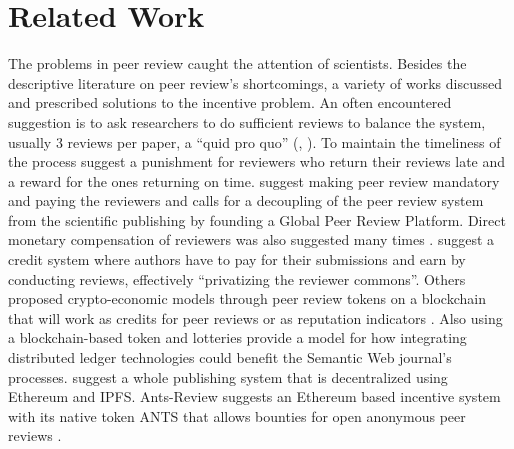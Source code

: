 \section{Related Work}

The problems in peer review caught the attention of scientists. Besides the descriptive literature on peer review’s shortcomings, a variety of works discussed and prescribed solutions to the incentive problem. An often encountered suggestion is to ask researchers to do sufficient reviews to balance the system, usually 3 reviews per paper, a “quid pro quo” (\cite{Derraik.2015}, \cite[5201]{Grainger.2007}). To maintain the timeliness of the process \cite{Hauser.2007} suggest a punishment for reviewers who return their reviews late and a reward for the ones returning on time. \cite{Ferreira.2016} suggest making peer review mandatory and paying the reviewers and calls for a decoupling of the peer review system from the scientific publishing by founding a Global Peer Review Platform. Direct monetary compensation of reviewers was also suggested many times \parencite{Prufer.2010}. \cite{Fox.2010} suggest a credit system where authors have to pay for their submissions and earn by conducting reviews, effectively “privatizing the reviewer commons”. Others proposed crypto-economic models through peer review tokens on a blockchain that will work as credits for peer reviews or as reputation indicators \parencite{Avital.2018, Jan.2018c, Spearpoint.2017, Tarkhanov.2020}. Also using a blockchain-based token and lotteries \cite{Janowicz.2018} provide a model for how integrating distributed ledger technologies could benefit the Semantic Web journal’s processes. \cite{TenorioFornes.2019} suggest a whole publishing system that is decentralized using Ethereum and IPFS. Ants-Review suggests an Ethereum based incentive system with its native token ANTS that allows bounties for open anonymous peer reviews \parencite{TrovoMassari}.